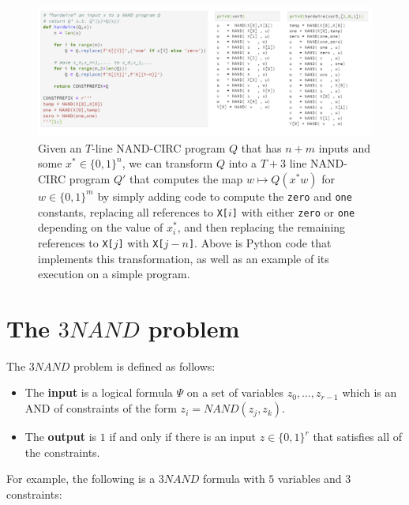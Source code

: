 \begin{figure}
\centering
\includegraphics[width=\textwidth, height=0.25\paperheight, keepaspectratio]{../figure/hardwiring.png}
\caption{Given an \(T\)-line NAND-CIRC program \(Q\) that has \(n+m\)
inputs and some \(x^*\in \{0,1\}^n\), we can transform \(Q\) into a
\(T+3\) line NAND-CIRC program \(Q'\) that computes the map
\(w \mapsto Q(x^*w)\) for \(w\in \{0,1\}^m\) by simply adding code to
compute the \texttt{zero} and \texttt{one} constants, replacing all
references to \texttt{X[}\(i\)\texttt{]} with either \texttt{zero} or
\texttt{one} depending on the value of \(x^*_i\), and then replacing the
remaining references to \texttt{X[}\(j\)\texttt{]} with
\texttt{X[}\(j-n\)\texttt{]}. Above is Python code that implements this
transformation, as well as an example of its execution on a simple
program.}
\label{hardwiringfig}
\end{figure}

\section{The \(3\ensuremath{\mathit{NAND}}\)
problem}\label{The-ensuremathmathitNAND-}

The \(3\ensuremath{\mathit{NAND}}\) problem is defined as follows:

\begin{itemize}
\item
  The \textbf{input} is a logical formula \(\Psi\) on a set of variables
  \(z_0,\ldots,z_{r-1}\) which is an AND of constraints of the form
  \(z_i = \ensuremath{\mathit{NAND}}(z_j,z_k)\).
\item
  The \textbf{output} is \(1\) if and only if there is an input
  \(z\in \{0,1\}^r\) that satisfies all of the constraints.
\end{itemize}

For example, the following is a \(3\ensuremath{\mathit{NAND}}\) formula
with \(5\) variables and \(3\) constraints:

